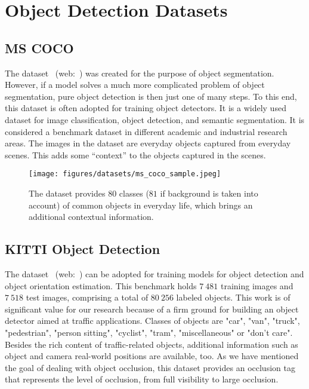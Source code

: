 \section{Object Detection Datasets}
\label{sec:ObjectDetectionDatasets}

\subsection{MS COCO}
\label{ssec:DatasetMSCOCO}

The  dataset~\cite{Lin2014} (web:~\cite{mscocodataset}) was created for the purpose of object segmentation. However, if a model solves a much more complicated problem of object segmentation, pure object detection is then just one of many steps. To this end, this dataset is often adopted for training object detectors. It is a widely used dataset for image classification, object detection, and semantic segmentation. It is considered a benchmark dataset in different academic and industrial research areas. The images in the dataset are everyday objects captured from everyday scenes. This adds some “context” to the objects captured in the scenes.

\begin{figure}[t]
    \centerline{\texttt{[image: figures/datasets/ms\_coco\_sample.jpeg]}}
    \caption[ dataset]{The  dataset provides $80$ classes ($81$ if background is taken into account) of common objects in everyday life, which brings an additional contextual information. }
    \label{fig:DatasetMSCOCO}
\end{figure}

\subsection{KITTI Object Detection}
\label{ssec:DatasetKITTIObjectDetection}

The  dataset~\cite{Geiger2012CVPR} (web:~\cite{kittiobjectdetectiondataset}) can be adopted for training models for object detection and object orientation estimation. This benchmark holds $7\ 481$ training images and $7\ 518$ test images, comprising a total of $80\ 256$ labeled objects. This work is of significant value for our research because of a firm ground for building an object detector aimed at traffic applications. Classes of objects are "car", "van", "truck", "pedestrian", "person sitting", "cyclist", "tram", "miscellaneous" or "don't care". Besides the rich content of traffic-related objects, additional information such as object and camera real-world positions are available, too. As we have mentioned the goal of dealing with object occlusion, this dataset provides an occlusion tag that represents the level of occlusion, from full visibility to large occlusion.


